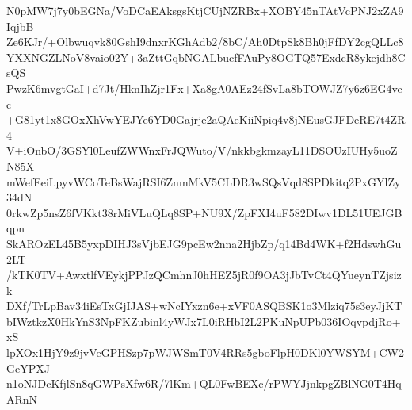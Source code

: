 N0pMW7j7y0bEGNa/VoDCaEAksgsKtjCUjNZRBx+XOBY45nTAtVcPNJ2xZA9IqjbB
Ze6KJr/+Olbwuqvk80GshI9dnxrKGhAdb2/8bC/Ah0DtpSk8Bh0jFfDY2cgQLLc8
YXXNGZLNoV8vaio02Y+3aZttGqbNGALbucfFAuPy8OGTQ57ExdcR8ykejdh8CsQS
PwzK6mvgtGaI+d7Jt/HknIhZjr1Fx+Xa8gA0AEz24fSvLa8bTOWJZ7y6z6EG4vec
+G81yt1x8GOxXhVwYEJYe6YD0Gajrje2aQAeKiiNpiq4v8jNEusGJFDeRE7t4ZR4
V+iOnbO/3GSYl0LeufZWWnxFrJQWuto/V/nkkbgkmzayL11DSOUzIUHy5uoZN85X
mWefEeiLpyvWCoTeBsWajRSI6ZnmMkV5CLDR3wSQsVqd8SPDkitq2PxGYlZy34dN
0rkwZp5nsZ6fVKkt38rMiVLuQLq8SP+NU9X/ZpFXI4uF582DIwv1DL51UEJGBqpn
SkAROzEL45B5yxpDIHJ3sVjbEJG9pcEw2nna2HjbZp/q14Bd4WK+f2HdswhGu2LT
/kTK0TV+AwxtlfVEykjPPJzQCmhnJ0hHEZ5jR0f9OA3jJbTvCt4QYueynTZjsizk
DXf/TrLpBav34iEsTxGjIJAS+wNcIYxzn6e+xVF0ASQBSK1o3Mlziq75s3eyJjKT
bIWztkzX0HkYnS3NpFKZubinl4yWJx7L0iRHbI2L2PKuNpUPb036IOqvpdjRo+xS
lpXOx1HjY9z9jvVeGPHSzp7pWJWSmT0V4RRs5gboFlpH0DKl0YWSYM+CW2GeYPXJ
n1oNJDcKfjlSn8qGWPsXfw6R/7lKm+QL0FwBEXc/rPWYJjnkpgZBlNG0T4HqARnN
